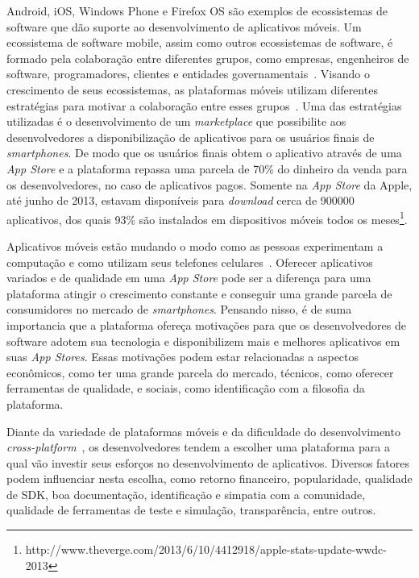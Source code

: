 \documentclass[conference]{IEEEtran}
\begin{document}
Android, iOS, Windows Phone e Firefox OS são exemplos de ecossistemas de software que dão suporte ao desenvolvimento de aplicativos móveis. Um ecossistema de software mobile, assim como outros ecossistemas de software, é formado pela colaboração entre diferentes grupos, como empresas, engenheiros de software, programadores, clientes e entidades governamentais~\cite{Jansen2013,Scacchi2012}. Visando o crescimento de seus ecossistemas, as plataformas móveis utilizam diferentes estratégias para motivar a colaboração entre esses grupos~\cite{Corral2014}. Uma das estratégias utilizadas é o desenvolvimento de um \emph{marketplace} que possibilite aos desenvolvedores a disponibilização de aplicativos para os usuários finais de \emph{smartphones}. De modo que os usuários finais obtem o aplicativo através de uma \emph{App Store} e a plataforma repassa uma parcela de 70\% do dinheiro da venda para os desenvolvedores, no caso de aplicativos pagos. Somente na \emph{App Store} da Apple, até junho de 2013, estavam disponíveis para \emph{download} cerca de 900000 aplicativos, dos quais 93\% são instalados em dispositivos móveis todos os meses\footnote{http://www.theverge.com/2013/6/10/4412918/apple-stats-update-wwdc-2013}. 
  
Aplicativos móveis estão mudando o modo como as pessoas experimentam a computação e como utilizam seus telefones celulares~\cite{Butler2011}. Oferecer aplicativos variados e de qualidade em uma \emph{App Store} pode ser a diferença para uma plataforma atingir o crescimento constante e conseguir uma grande parcela de consumidores no mercado de \emph{smartphones}. Pensando nisso, é de suma importancia que a plataforma ofereça motivações para que os desenvolvedores de software adotem sua tecnologia e disponibilizem mais e melhores aplicativos em suas \emph{App Stores}. Essas motivações podem estar relacionadas a aspectos econômicos, como ter uma grande parcela do mercado, técnicos, como oferecer ferramentas de qualidade, e sociais, como identificação com a filosofia da plataforma.

Diante da variedade de plataformas móveis e da dificuldade do desenvolvimento \emph{cross-platform}~\cite{Corral2012}, os desenvolvedores tendem a escolher uma plataforma para a qual vão investir seus esforços no desenvolvimento de aplicativos. Diversos fatores podem influenciar nesta escolha, como retorno financeiro, popularidade, qualidade de SDK, boa documentação, identificação e simpatia com a comunidade, qualidade de ferramentas de teste e simulação, transparência, entre outros. 
\end{document}
